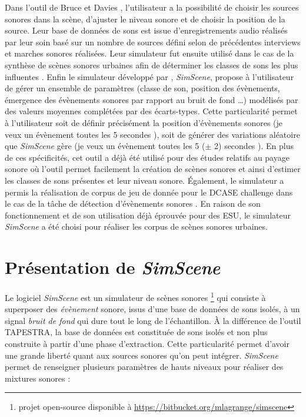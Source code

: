 Dans l'outil de Bruce et Davies \cite{bruce_development_2009}, l'utilisateur a la possibilité de choisir les sources sonores dans la scène, d'ajuster le niveau sonore et de choisir la position de la source. Leur base de données de sons est issue d'enregistrements audio réalisés par leur soin basé sur un nombre de sources défini selon de précédentes interviews et marches sonores réalisées. Leur simulateur fut ensuite utilisé dans le cas de la synthèse de scènes sonores urbaines afin de déterminer les classes de sons les plus influentes \cite{davies2014soundscape}.
Enfin le simulateur développé par \cite{lagrange2015evaluation}, \textit{SimScene}, propose à l'utilisateur de gérer un ensemble de paramètres (classe de son, position des évènements, émergence des évènements sonores par rapport au bruit de fond \dots) modélisés par des valeurs moyennes complétées par des écarts-types. 
Cette particularité permet à l'utilisateur soit de définir précisément la position d'évènements sonores (\og je veux un évènement toutes les 5 secondes \fg{}), soit de générer des variations aléatoire que \textit{SimScene} gère (\og je veux un évènement toutes les 5 ($\pm$ 2) secondes \fg{}). 
En plus de ces spécificités, cet outil a déjà été utilisé pour des études relatifs au payage sonore \cite{lafay2015approaching} où l'outil permet facilement la création de scènes sonores et ainsi d'estimer les classes de sons présentes et leur niveau sonore. \'Egalement, le simulateur a permis la réalisation de corpus de jeu de donnée pour le DCASE challenge \cite{stowell2015detection} dans le cas de la tâche de détection d'évènements sonores \cite{lagrange2015evaluation}. 
En raison de son fonctionnement et de son utilisation déjà éprouvée pour des ESU, le simulateur \textit{SimScene} a été choisi pour réaliser les corpus de scènes sonores urbaines.

\section{Présentation de \textit{SimScene}}
Le logiciel \textit{SimScene} \cite{rossignol_simscene_2015} est un simulateur de scènes sonores \footnote{projet open-source disponible à \url{https://bitbucket.org/mlagrange/simscene}} qui consiste à superposer des \textit{évènement} sonore, issus d'une base de données de sons isolés, à un signal \textit{bruit de fond} qui dure tout le long de l'échantillon. À la différence de l'outil TAPESTRA, la base de données est constituée de sons isolés et non plus construite à partir d'une phase d'extraction. Cette particularité permet d'avoir une grande liberté quant aux sources sonores qu'on peut intégrer. \textit{SimScene} permet de renseigner plusieurs paramètres de hauts niveaux pour réaliser des mixtures sonores :

